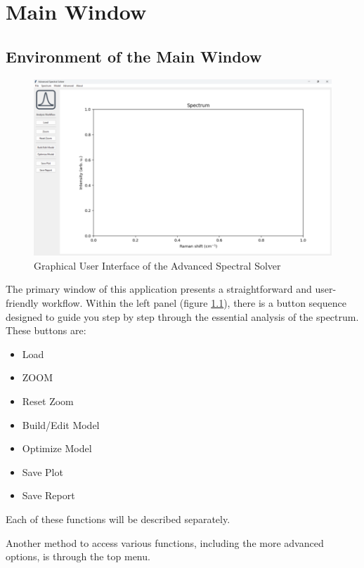 \chapter{Main Window}
\label{cha:Main Window}
\section{Environment of the Main Window}

\begin{figure}[H]
    \centering
    \includegraphics[width=1\linewidth]{Resources/ASS2_GUI.png}
    \caption{Graphical User Interface of the Advanced Spectral Solver}
    \label{GUI_main}
\end{figure}

The primary window of this application presents a straightforward and user-friendly workflow. Within the left panel (figure \ref{GUI_main}), there is a button sequence designed to guide you step by step through the essential analysis of the spectrum. These buttons are:

\begin{itemize}
    \item Load
    \item ZOOM
    \item Reset Zoom
    \item Build/Edit Model
    \item Optimize Model
    \item Save Plot
    \item Save Report
\end{itemize}

Each of these functions will be described separately.

Another method to access various functions, including the more advanced options, is through the top menu.


